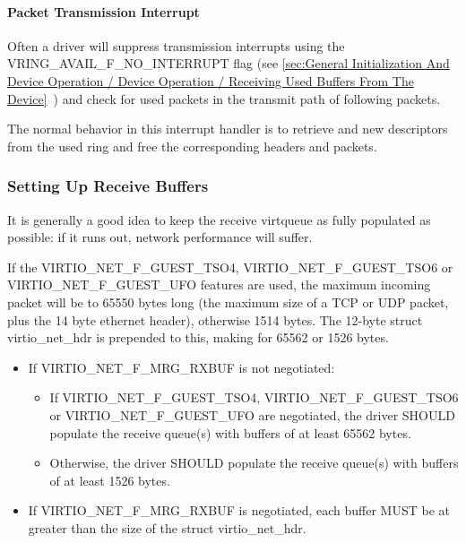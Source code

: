 \paragraph{Packet Transmission Interrupt}\label{sec:Device Types / Network Device / Device Operation / Packet Transmission / Packet Transmission Interrupt}

Often a driver will suppress transmission interrupts using the
VRING_AVAIL_F_NO_INTERRUPT flag
 (see \ref{sec:General Initialization And Device Operation / Device Operation / Receiving Used Buffers From The Device}~)
and check for used packets in the transmit path of following
packets.

The normal behavior in this interrupt handler is to retrieve and
new descriptors from the used ring and free the corresponding
headers and packets.

\subsubsection{Setting Up Receive Buffers}\label{sec:Device Types / Network Device / Device Operation / Setting Up Receive Buffers}

It is generally a good idea to keep the receive virtqueue as
fully populated as possible: if it runs out, network performance
will suffer.

If the VIRTIO_NET_F_GUEST_TSO4, VIRTIO_NET_F_GUEST_TSO6 or
VIRTIO_NET_F_GUEST_UFO features are used, the maximum incoming packet
will be to 65550 bytes long (the maximum size of a
TCP or UDP packet, plus the 14 byte ethernet header), otherwise
1514 bytes.  The 12-byte struct virtio_net_hdr is prepended to this,
making for 65562 or 1526 bytes.


\begin{itemize}
\item If VIRTIO_NET_F_MRG_RXBUF is not negotiated:
  \begin{itemize}
    \item If VIRTIO_NET_F_GUEST_TSO4, VIRTIO_NET_F_GUEST_TSO6 or
      VIRTIO_NET_F_GUEST_UFO are negotiated, the driver SHOULD populate
      the receive queue(s) with buffers of at least 65562 bytes.
    \item Otherwise, the driver SHOULD populate the receive queue(s)
      with buffers of at least 1526 bytes.
  \end{itemize}
\item If VIRTIO_NET_F_MRG_RXBUF is negotiated, each buffer MUST be at
  greater than the size of the struct virtio_net_hdr.
\end{itemize}

